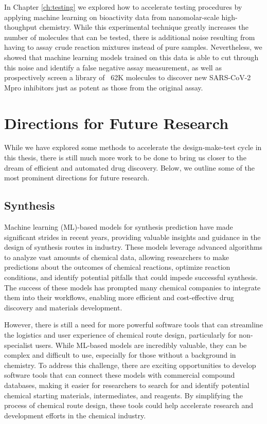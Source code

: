 In Chapter \ref{ch:testing} we explored how to accelerate testing procedures by applying machine learning on bioactivity data from nanomolar-scale high-thoughput chemistry. While this experimental technique greatly increases the number of molecules that can be tested, there is additional noise resulting from having to assay crude reaction mixtures instead of pure samples. Nevertheless, we showed that machine learning models trained on this data is able to cut through this noise and identify a false negative assay measurement, as well as prospectively screen a library of ~62K molecules to discover new SARS-CoV-2 Mpro inhibitors just as potent as those from the original assay.

\section{Directions for Future Research}

While we have explored some methods to accelerate the design-make-test cycle in this thesis, there is still much more work to be done to bring us closer to the dream of efficient and automated drug discovery. Below, we outline some of the most prominent directions for future research.

\subsection{Synthesis}
Machine learning (ML)-based models for synthesis prediction have made significant strides in recent years, providing valuable insights and guidance in the design of synthesis routes in industry. These models leverage advanced algorithms to analyze vast amounts of chemical data, allowing researchers to make predictions about the outcomes of chemical reactions, optimize reaction conditions, and identify potential pitfalls that could impede successful synthesis. The success of these models has prompted many chemical companies to integrate them into their workflows, enabling more efficient and cost-effective drug discovery and materials development.

However, there is still a need for more powerful software tools that can streamline the logistics and user experience of chemical route design, particularly for non-specialist users. While ML-based models are incredibly valuable, they can be complex and difficult to use, especially for those without a background in chemistry. To address this challenge, there are exciting opportunities to develop software tools that can connect these models with commercial compound databases, making it easier for researchers to search for and identify potential chemical starting materials, intermediates, and reagents. By simplifying the process of chemical route design, these tools could help accelerate research and development efforts in the chemical industry.

